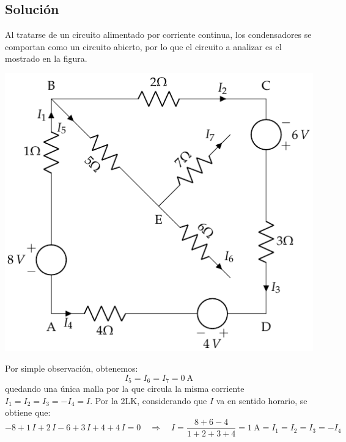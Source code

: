 \subsection*{Solución}
Al tratarse de un circuito alimentado por corriente continua, los
condensadores se comportan como un circuito abierto, por lo que el
circuito a analizar es el mostrado en la figura.

\begin{center}
  \includegraphics{figuras/BT1_09_sol.pdf}
\end{center}

Por simple observación, obtenemos:
\begin{equation*}
  I_5=I_6=I_7=\qty{0}{\ampere}
\end{equation*}
quedando una única malla por la que circula la misma corriente
$I_1=I_2=I_3=-I_4=I$. Por la 2LK, considerando que $I$ va en sentido
horario, se obtiene que:
\begin{equation*}
  -8+1\, I+2\,I-6+3\,I+4+4\,I=0 \quad \Rightarrow \quad {I = \dfrac{8+6-4}{1+2+3+4}=\qty{1}{\ampere}=I_1=I_2=I_3=-I_4}
\end{equation*}

